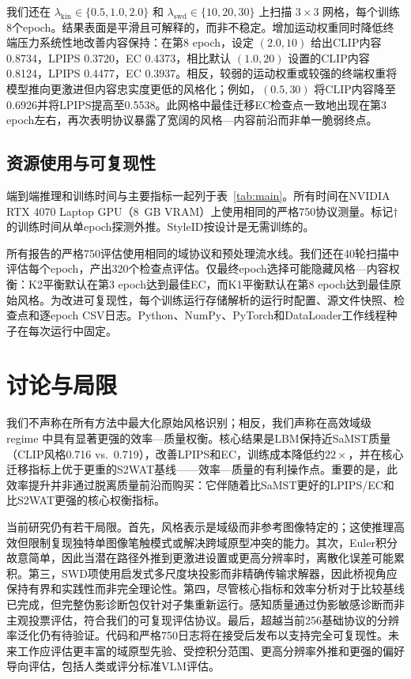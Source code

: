 \documentclass[letterpaper]{article}
\begin{document}
我们还在 $\lambda_{\mathrm{kin}} \in \{0.5, 1.0, 2.0\}$ 和 $\lambda_{\mathrm{swd}} \in \{10, 20, 30\}$ 上扫描 $3 \times 3$ 网格，每个训练8个epoch。结果表面是平滑且可解释的，而非不稳定。增加运动权重同时降低终端压力系统性地改善内容保持：在第8 epoch，设定 $(2.0, 10)$ 给出CLIP内容0.8734，LPIPS 0.3720，EC 0.4373，相比默认 $(1.0, 20)$ 设置的CLIP内容0.8124，LPIPS 0.4477，EC 0.3937。相反，较弱的运动权重或较强的终端权重将模型推向更激进但内容忠实度更低的风格化；例如，$(0.5, 30)$ 将CLIP内容降至0.6926并将LPIPS提高至0.5538。此网格中最佳迁移EC检查点一致地出现在第3 epoch左右，再次表明协议暴露了宽阔的风格—内容前沿而非单一脆弱终点。

\subsection{资源使用与可复现性}
端到端推理和训练时间与主要指标一起列于表~\ref{tab:main}。所有时间在NVIDIA RTX 4070 Laptop GPU（8~GB VRAM）上使用相同的严格750协议测量。标记$\dagger$的训练时间从单epoch探测外推。StyleID按设计是无需训练的。

所有报告的严格750评估使用相同的域协议和预处理流水线。我们还在40轮扫描中评估每个epoch，产出320个检查点评估。仅最终epoch选择可能隐藏风格—内容权衡：K2平衡默认在第3 epoch达到最佳EC，而K1平衡默认在第8 epoch达到最佳原始风格。为改进可复现性，每个训练运行存储解析的运行时配置、源文件快照、检查点和逐epoch CSV日志。Python、NumPy、PyTorch和DataLoader工作线程种子在每次运行中固定。

\section{讨论与局限}
我们不声称在所有方法中最大化原始风格识别；相反，我们声称在高效域级 regime 中具有显著更强的效率—质量权衡。核心结果是LBM保持近SaMST质量（CLIP风格0.716 vs.\ 0.719），改善LPIPS和EC，训练成本降低约$22\times$，并在核心迁移指标上优于更重的S2WAT基线——效率—质量的有利操作点。重要的是，此效率提升并非通过脱离质量前沿而购买：它伴随着比SaMST更好的LPIPS/EC和比S2WAT更强的核心权衡指标。

当前研究仍有若干局限。首先，风格表示是域级而非参考图像特定的；这使推理高效但限制复现独特单图像笔触模式或解决跨域原型冲突的能力。其次，Euler积分故意简单，因此当潜在路径外推到更激进设置或更高分辨率时，离散化误差可能累积。第三，SWD项使用启发式多尺度块投影而非精确传输求解器，因此桥视角应保持有界和实践性而非完全理论性。第四，尽管核心指标和效率分析对于比较基线已完成，但完整伪影诊断包仅针对子集重新运行。感知质量通过伪影敏感诊断而非主观投票评估，符合我们的可复现评估协议。最后，超越当前256基础协议的分辨率泛化仍有待验证。代码和严格750日志将在接受后发布以支持完全可复现性。未来工作应评估更丰富的域原型先验、受控积分范围、更高分辨率外推和更强的偏好导向评估，包括人类或评分标准VLM评估。
\end{document}
